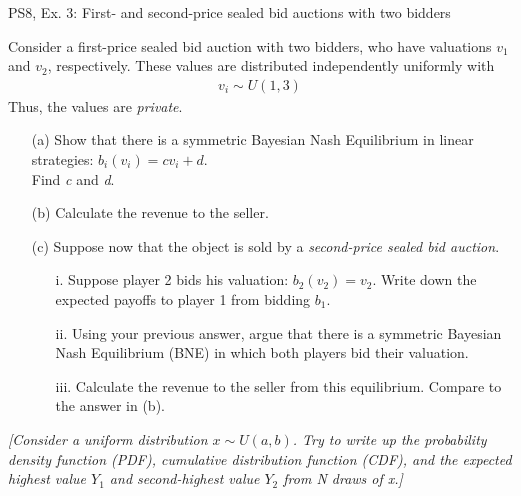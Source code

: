 \begin{frame}{PS8, Ex. 3: First- and second-price sealed bid auctions with two bidders}
    \begin{multicols}{2}
      Consider a first-price sealed bid auction with two bidders, who have valuations $v_1$ and $v_2$, respectively. These values are distributed independently uniformly with
      \begin{align*}
        v_i\sim U(1,3)
      \end{align*}
      Thus, the values are \textit{private}.
      \begin{itemize}
        \item[(a)] Show that there is a symmetric Bayesian Nash Equilibrium in linear strategies: $b_i(v_i) = cv_i + d$.\\
                   Find \textit{c} and \textit{d}.
        \item[(b)] Calculate the revenue to the seller.
      \end{itemize}
      \vfill\null\columnbreak
      \begin{itemize}
        \item[(c)] Suppose now that the object is sold by a \textit{second-price sealed bid auction}.
        \begin{itemize}\normalsize
          \item[i.]   Suppose player 2 bids his valuation: $b_2(v_2) = v_2$. Write down the expected payoffs to player 1 from bidding $b_1$.
          \item[ii.]  Using your previous answer, argue that there is a symmetric Bayesian Nash Equilibrium (BNE) in which both players bid their valuation.
          \item[iii.] Calculate the revenue to the seller from this equilibrium. Compare to the answer in (b).
        \end{itemize}
      \end{itemize}
      \vfill\null
    \end{multicols}
    \vspace{-8pt}
    \textit{[Consider a uniform distribution $x\sim U(a, b)$. Try to write up the probability density function (PDF), cumulative distribution function (CDF), and the expected highest value $Y_1$ and second-highest value $Y_2$ from N draws of x.]}
\end{frame}
